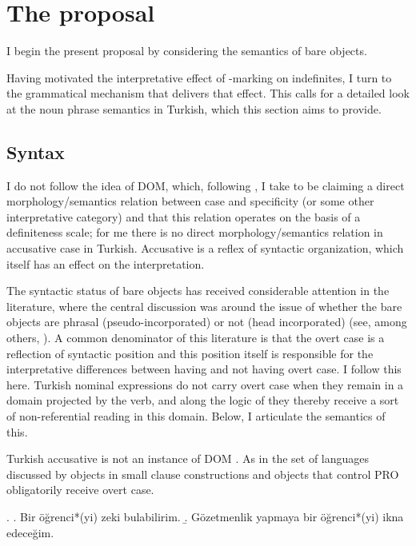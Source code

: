 \documentclass[11pt,a4paper]{article}
\begin{document}
\section{The proposal}

I begin the present proposal by considering the semantics of bare objects.

Having motivated the interpretative effect of \acc-marking on indefinites, I turn to the grammatical mechanism that delivers that effect. This calls for a detailed look at the noun phrase semantics in Turkish, which this section aims to provide.


\subsection{Syntax}

I do not follow the idea of DOM, which, following \cite{lopez12}, I take to be claiming a direct morphology/semantics relation between case and specificity (or some other interpretative category) and that this relation operates on the basis of a definiteness scale; for me there is no direct morphology/semantics relation in accusative case in Turkish. Accusative is a reflex of syntactic organization, which itself has an effect on the interpretation.


The syntactic status of bare objects has received considerable attention in the literature, where the central discussion was around the issue of whether the bare objects are phrasal (pseudo-incorporated) or not (head incorporated) (see, among others, ). A common denominator of this literature is that the overt case is a reflection of syntactic position and this position itself is responsible for the interpretative differences between having and not having overt case. I follow this here. Turkish nominal expressions do not carry overt case when they remain in a domain projected by the verb, and along the logic of  they thereby receive a sort of non-referential reading in this domain. Below, I articulate the semantics of this.    

Turkish accusative is not an instance of DOM \cite{aissen03}. As in the set of languages discussed by \cite{lopez12} objects in small clause constructions and objects that control PRO obligatorily receive overt case.

\ex.
\a. Bir öğrenci*(yi) zeki bulabilirim.
\b. Gözetmenlik yapmaya bir öğrenci*(yi) ikna edeceğim. 
\end{document}
